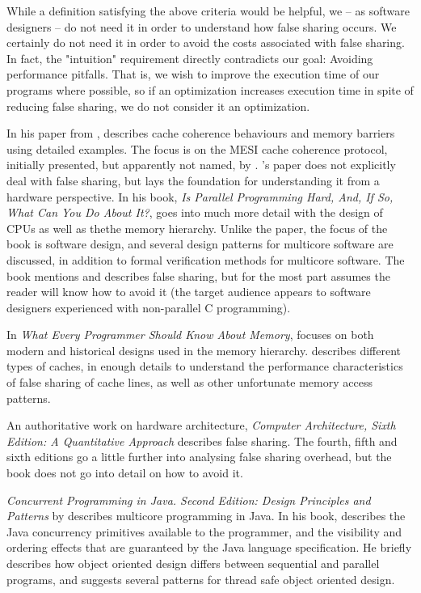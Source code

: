 While a definition satisfying the above criteria would be helpful, we -- as
software designers -- do not need it in order to understand how false sharing
occurs. We certainly do not need it in order to avoid the costs associated with
false sharing. In fact, the "intuition" requirement directly contradicts our
goal: Avoiding performance pitfalls. That is, we wish to improve the execution
time of our programs where possible, so if an optimization increases execution
time in spite of reducing false sharing, we do not consider it an optimization.


In his paper from \citeyear{mckenny-barriers} \cite{mckenny-barriers}, \citeauthor{mckenny-barriers}
describes cache coherence behaviours and memory barriers using detailed
examples. The focus is on the MESI cache coherence protocol, initially
presented, but apparently not named, by \citeauthor{mesi} \cite{mesi}.
\citeauthor{mckenny-barriers}'s paper
does not explicitly deal with false sharing, but lays the foundation for
understanding it from a hardware perspective. In his book, \textit{Is Parallel
Programming Hard, And, If So, What Can You Do About It?}\cite{mckenney},
\citeauthor{mckenney} goes into much more detail with the design of CPUs as well
as thethe memory hierarchy. Unlike the \citeyear{mckenny-barriers} paper, the
focus of the book is software design, and several design patterns for multicore
software are discussed, in addition to formal verification methods for multicore
software. The book mentions and describes false sharing, but for the most part
assumes the reader will know how to avoid it (the target audience appears to
software designers experienced with non-parallel C programming).

In \textit{What Every Programmer Should Know About Memory},
\citeauthor{whatprogrammersshouldknow} \cite{whatprogrammersshouldknow} focuses
on both modern and historical designs used in the memory hierarchy.
\citeauthor{whatprogrammersshouldknow} describes different types of caches, in
enough details to understand the performance characteristics of false sharing of
cache lines, as well as other unfortunate memory access patterns.

An authoritative work on hardware architecture, \textit{Computer Architecture,
Sixth Edition: A Quantitative Approach} \cite{quantarch} describes false
sharing. The fourth, fifth and sixth editions go a little further into analysing
false sharing overhead, but the book does not go into detail on how to avoid it.

\textit{Concurrent Programming in Java. Second Edition: Design Principles and
Patterns} by \citeauthor{lea} describes multicore programming in Java.
In his book, \citeauthor{lea} describes the Java concurrency primitives
available to the programmer, and the visibility and ordering effects that are
guaranteed by the Java language specification. He briefly describes how object
oriented design differs between sequential and parallel programs, and suggests
several patterns for thread safe object oriented design.
